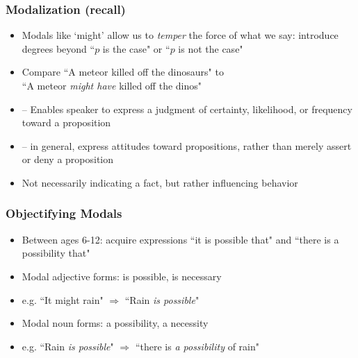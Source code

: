 \begin{frame}
\frametitle{Modalization (recall)}

\begin{itemize}%

\item Modals like `might' allow us to \textit{temper} the force of what we say: introduce degrees beyond ``$p$ is the case" or ``$p$ is not the case"

\item Compare ``A meteor killed off the dinosaurs" to \\ ``A meteor \textit{might have} killed off the dinos"

\item[] -- Enables speaker to express a judgment of certainty, likelihood, or frequency toward a proposition

\item[] -- in general, express attitudes toward propositions, rather than merely assert or deny a proposition 

\item Not necessarily indicating a fact, but rather influencing behavior

\end{itemize}
\end{frame}

\begin{frame}
\frametitle{Objectifying Modals}

\begin{itemize}[<+->]

\item Between ages 6-12: acquire expressions ``it is possible that" and ``there is a possibility that" 

\item Modal adjective forms: is possible, is necessary

\item[] e.g. ``It might rain" $\Rightarrow$ ``Rain \textit{is possible}"

\item Modal noun forms: a possibility, a necessity

\item[] e.g. ``Rain \textit{is possible}" $\Rightarrow$ ``there is \textit{a possibility} of rain"


\end{itemize}
\end{frame}

